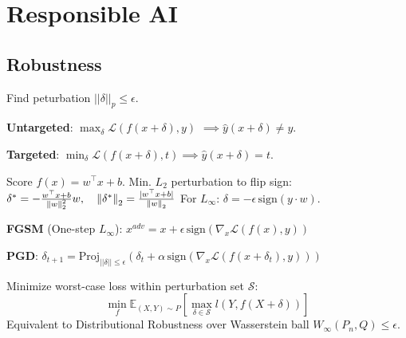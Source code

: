 \section{Responsible AI}

\subsection{Robustness}

\begin{definition}[Adv. Ex.]
    Find peturbation \(||\delta||_p \le \epsilon\).
    \begin{itemize*}
        \item \textbf{Untargeted}: \(\max_{\delta} \mathcal{L}(f(x+\delta), y)\) \( \implies \hat{y}(x+\delta) \neq y\).
        \item \textbf{Targeted}: \(\min_{\delta} \mathcal{L}(f(x+\delta), t) \implies \hat{y}(x+\delta) = t\).
    \end{itemize*}
\end{definition}

\begin{definition}
    Score \(f(x) = w^\top x + b\). Min. \(L_2\) perturbation to flip sign:
    \(\delta^* = - \frac{w^\top x + b}{\norm{w}_2^2} w, \quad \norm{\delta^*}_2 = \frac{|w^\top x + b|}{\norm{w}_2}\)
    For \(L_\infty\): \(\delta = - \epsilon \, \text{sign}(y \cdot w)\).
\end{definition}

\begin{definition}[Attacks]
    \textbf{FGSM} (One-step \(L_\infty\)):
    \(x^{adv} = x + \epsilon \, \text{sign}(\nabla_x \mathcal{L}(f(x), y))\)

    \textbf{PGD}:
    \( \delta_{t+1} = \text{Proj}_{||\delta|| \le \epsilon} \left( \delta_t + \alpha \, \text{sign}(\nabla_x \mathcal{L}(f(x+\delta_t), y)) \right) \)

\end{definition}

\begin{definition}
    Minimize worst-case loss within perturbation set \(\mathcal{S}\):
    \[ \min_f \mathbb{E}_{(X,Y) \sim P} \left[ \max_{\delta \in \mathcal{S}} l(Y, f(X+\delta)) \right] \]
    Equivalent to Distributional Robustness over Wasserstein ball \(W_\infty(P_n, Q) \le \epsilon\).
\end{definition}

